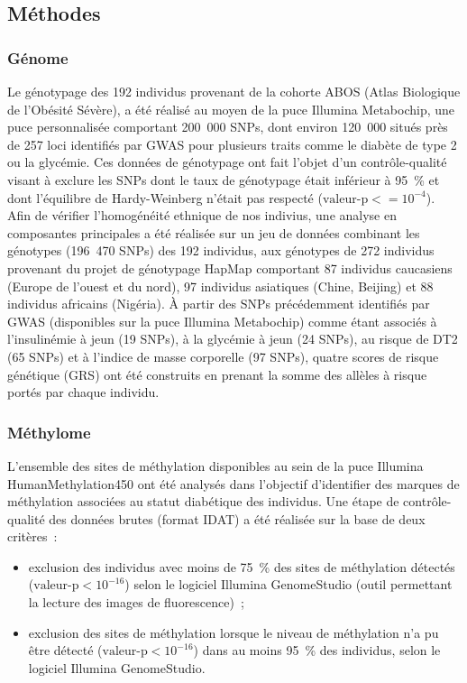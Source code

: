 \documentclass[11pt,a4paper,notrimn]{krantz}
\theoremstyle{definition}
\theoremstyle{definition}
\theoremstyle{remark}
\begin{document}
\subsection{Méthodes}\label{methodes-2}

\subsubsection{Génome}\label{genome-1}

Le génotypage des 192 individus provenant de la cohorte ABOS (Atlas
Biologique de l'Obésité Sévère), a été réalisé au moyen de la puce
Illumina Metabochip, une puce personnalisée comportant 200~000 SNPs,
dont environ 120~000 situés près de 257 loci identifiés par GWAS pour
plusieurs traits comme le diabète de type 2 ou la glycémie. Ces données
de génotypage ont fait l'objet d'un contrôle-qualité visant à exclure
les SNPs dont le taux de génotypage était inférieur à 95~\% et dont
l'équilibre de Hardy-Weinberg n'était pas respecté
(\(\textrm{valeur-p}<=10^{-4}\)). Afin de vérifier l'homogénéité
ethnique de nos indivius, une analyse en composantes principales a été
réalisée sur un jeu de données combinant les génotypes (196~470 SNPs)
des 192 individus, aux génotypes de 272 individus provenant du projet de
génotypage HapMap comportant 87 individus caucasiens (Europe de l'ouest
et du nord), 97 individus asiatiques (Chine, Beijing) et 88 individus
africains (Nigéria). À partir des SNPs précédemment identifiés par GWAS
(disponibles sur la puce Illumina Metabochip) comme étant associés à
l'insulinémie à jeun (19 SNPs), à la glycémie à jeun (24 SNPs), au
risque de DT2 (65 SNPs) et à l'indice de masse corporelle (97 SNPs),
quatre scores de risque génétique (GRS) ont été construits en prenant la
somme des allèles à risque portés par chaque individu.

\subsubsection{Méthylome}\label{methylome}

L'ensemble des sites de méthylation disponibles au sein de la puce
Illumina HumanMethylation450 ont été analysés dans l'objectif
d'identifier des marques de méthylation associées au statut diabétique
des individus. Une étape de contrôle-qualité des données brutes (format
IDAT) a été réalisée sur la base de deux critères~:

\begin{itemize}
\item
  exclusion des individus avec moins de 75~\% des sites de méthylation
  détectés (\(\textrm{valeur-p}<10^{-16}\)) selon le logiciel Illumina
  GenomeStudio (outil permettant la lecture des images de
  fluorescence)~;
\item
  exclusion des sites de méthylation lorsque le niveau de méthylation
  n'a pu être détecté (\(\textrm{valeur-p}<10^{-16}\)) dans au moins
  95~\% des individus, selon le logiciel Illumina GenomeStudio.
\end{itemize}
\end{document}
